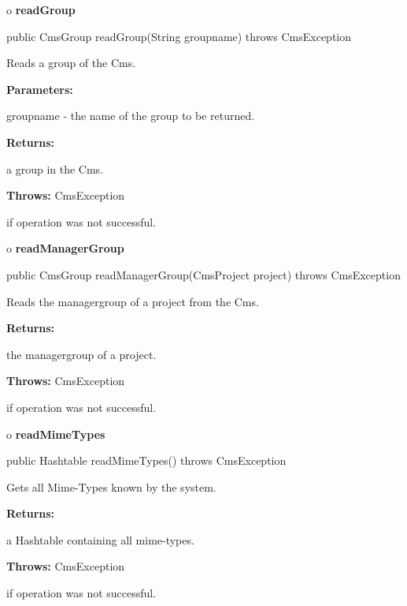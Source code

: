 o {\bf readGroup} 

\begin{PRE}
 public CmsGroup readGroup(String groupname) throws CmsException
\end{PRE}

\begin{description}
\htmlDD Reads a group of the Cms. 

\begin{description}
\item {\bf Parameters:}  

groupname - the name of the group to be returned.  
\item {\bf Returns:}  

a group in the Cms.  
\item {\bf Throws:} CmsException  

if operation was not successful.  
\end{description}

\end{description}

o {\bf readManagerGroup} 

\begin{PRE}
 public CmsGroup readManagerGroup(CmsProject project) throws CmsException
\end{PRE}

\begin{description}
\htmlDD Reads the managergroup of a project from the Cms. 

\begin{description}
\item {\bf Returns:}  

the managergroup of a project.  
\item {\bf Throws:} CmsException  

if operation was not successful.  
\end{description}

\end{description}

o {\bf readMimeTypes} 

\begin{PRE}
 public Hashtable readMimeTypes() throws CmsException
\end{PRE}

\begin{description}
\htmlDD Gets all Mime-Types known by the system. 

\begin{description}
\item {\bf Returns:}  

a Hashtable containing all mime-types.  
\item {\bf Throws:} CmsException  

if operation was not successful.  
\end{description}

\end{description}

